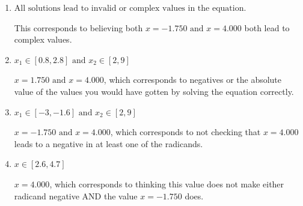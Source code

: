 \documentclass{extbook}[14pt]
\begin{document}
\begin{enumerate}
{\begin{enumerate}[label=\Alph*.]
* This is the correct option.
\item \( \text{All solutions lead to invalid or complex values in the equation.} \)

This corresponds to believing both $x = -1.750 \text{ and } x = 4.000$ both lead to complex values.
\item \( x_1 \in [0.8, 2.8] \text{ and } x_2 \in [2,9] \)

$x = 1.750 \text{ and } x = 4.000$, which corresponds to negatives or the absolute value of the values you would have gotten by solving the equation correctly.
\item \( x_1 \in [-3, -1.6] \text{ and } x_2 \in [2,9] \)

$x = -1.750 \text{ and } x = 4.000$, which corresponds to not checking that $x = 4.000$ leads to a negative in at least one of the radicands.
\item \( x \in [2.6,4.7] \)

$x = 4.000$, which corresponds to thinking this value does not make either radicand negative AND the value $x = -1.750$ does.
\end{enumerate}

}
\end{enumerate}
\end{document}
